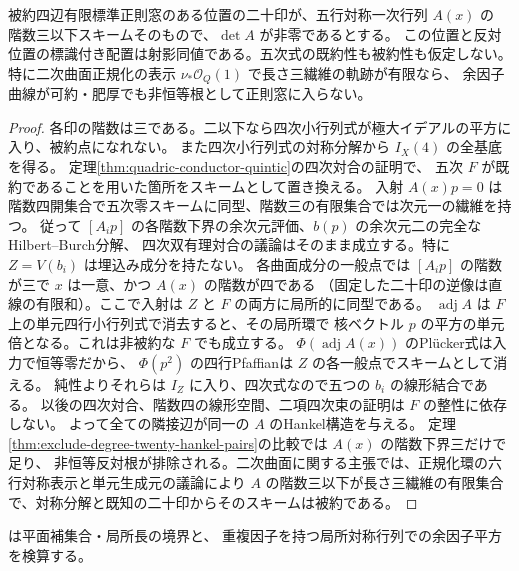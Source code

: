 \begin{theorem}\label{thm:finite-quintic-web-exclusion}
被約四辺有限標準正則窓のある位置の二十印が、五行対称一次行列 $A(x)$ の
階数三以下スキームそのもので、$\det A$ が非零であるとする。
この位置と反対位置の標識付き配置は射影同値である。五次式の既約性も被約性も仮定しない。
特に二次曲面正規化の表示 $\nu_*\mathcal O_Q(1)$ で長さ三繊維の軌跡が有限なら、
余因子曲線が可約・肥厚でも非恒等根として正則窓に入らない。
\end{theorem}
\begin{proof}
各印の階数は三である。二以下なら四次小行列式が極大イデアルの平方に入り、被約点になれない。
また四次小行列式の対称分解から $I_X(4)$ の全基底を得る。
定理\ref{thm:quadric-conductor-quintic}の四次対合の証明で、
五次 $F$ が既約であることを用いた箇所をスキームとして置き換える。
入射 $A(x)p=0$ は階数四開集合で五次零スキームに同型、階数三の有限集合では次元一の繊維を持つ。
従って $[A_i p]$ の各階数下界の余次元評価、$b(p)$ の余次元二の完全なHilbert--Burch分解、
四次双有理対合の議論はそのまま成立する。特に $Z=V(b_i)$ は埋込み成分を持たない。
各曲面成分の一般点では $[A_i p]$ の階数が三で $x$ は一意、かつ $A(x)$ の階数が四である
（固定した二十印の逆像は直線の有限和）。ここで入射は $Z$ と $F$ の両方に局所的に同型である。
$\operatorname{adj}A$ は $F$ 上の単元四行小行列式で消去すると、その局所環で
核ベクトル $p$ の平方の単元倍となる。これは非被約な $F$ でも成立する。
$\Phi(\operatorname{adj}A(x))$ のPlücker式は入力で恒等零だから、
$\Phi(p^2)$ の四行Pfaffianは $Z$ の各一般点でスキームとして消える。
純性よりそれらは $I_Z$ に入り、四次式なので五つの $b_i$ の線形結合である。
以後の四次対合、階数四の線形空間、二項四次束の証明は $F$ の整性に依存しない。
よって全ての隣接辺が同一の $A$ のHankel構造を与える。
定理\ref{thm:exclude-degree-twenty-hankel-pairs}の比較では $A(x)$ の階数下界三だけで足り、
非恒等反対根が排除される。二次曲面に関する主張では、正規化環の六行対称表示と単元生成元の議論により
$A$ の階数三以下が長さ三繊維の有限集合で、対称分解と既知の二十印からそのスキームは被約である。
\end{proof}
 は平面補集合・局所長の境界と、
重複因子を持つ局所対称行列での余因子平方を検算する。
